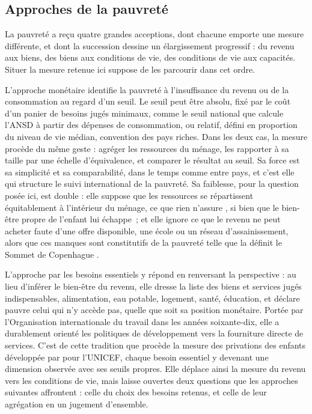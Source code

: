 \subsection{Approches de la pauvreté}

La pauvreté a reçu quatre grandes acceptions, dont chacune emporte une
mesure différente, et dont la succession dessine un élargissement
progressif : du revenu aux biens, des biens aux conditions de vie, des
conditions de vie aux capacités. Situer la mesure retenue ici suppose de
les parcourir dans cet ordre.

L'approche monétaire identifie la pauvreté à l'insuffisance du revenu ou
de la consommation au regard d'un seuil. Le seuil peut être absolu, fixé
par le coût d'un panier de besoins jugés minimaux, comme le seuil national
que calcule l'ANSD à partir des dépenses de consommation, ou relatif,
défini en proportion du niveau de vie médian, convention des pays riches.
Dans les deux cas, la mesure procède du même geste : agréger les
ressources du ménage, les rapporter à sa taille par une échelle
d'équivalence, et comparer le résultat au seuil. Sa force est sa
simplicité et sa comparabilité, dans le temps comme entre pays, et c'est
elle qui structure le suivi international de la pauvreté. Sa faiblesse,
pour la question posée ici, est double : elle suppose que les ressources
se répartissent équitablement à l'intérieur du ménage, ce que rien
n'assure \parencite{deaton1997}, si bien que le bien-être propre de
l'enfant lui échappe~; et elle ignore ce que le revenu ne peut acheter
faute d'une offre disponible, une école ou un réseau d'assainissement,
alors que ces manques sont constitutifs de la pauvreté telle que la
définit le Sommet de Copenhague \parencite{onu1995}.

L'approche par les besoins essentiels y répond en renversant la
perspective : au lieu d'inférer le bien-être du revenu, elle dresse la
liste des biens et services jugés indispensables, alimentation, eau
potable, logement, santé, éducation, et déclare pauvre celui qui n'y
accède pas, quelle que soit sa position monétaire. Portée par
l'Organisation internationale du travail dans les années soixante-dix,
elle a durablement orienté les politiques de développement vers la
fourniture directe de services. C'est de cette tradition que procède la
mesure des privations des enfants développée par \textcite{gordon2003}
pour l'UNICEF, chaque besoin essentiel y devenant une dimension observée
avec ses seuils propres. Elle déplace ainsi la mesure du revenu vers les
conditions de vie, mais laisse ouvertes deux questions que les approches
suivantes affrontent : celle du choix des besoins retenus, et celle de
leur agrégation en un jugement d'ensemble.

